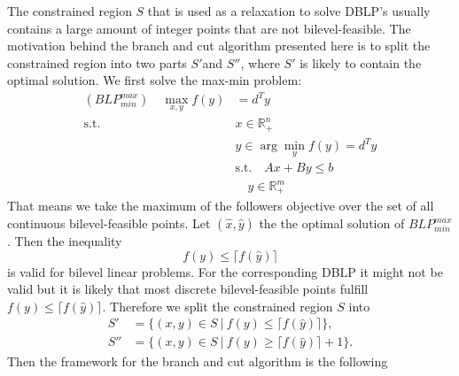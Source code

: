 \documentclass{article}
\begin{document}
The constrained region $S$ that is used as a relaxation to solve DBLP's usually contains a large amount of integer points that are not bilevel-feasible. The motivation behind the branch and cut algorithm presented here is to split the constrained region into two parts $S'$and $S''$, where $S'$ is likely to contain the optimal solution.
We first solve the max-min problem:
	\begin{align*}
	(BLP^{max}_{min}) \quad \max_{x,y} f(y) &= d^T y \\
	\text{s.t.} \quad &x \in \mathbb{R}^n_{+} \\
	&y \in \arg \min_{y} f(y) = d^Ty \\
	&\text{s.t.} \quad Ax + By \le b \\
	& \quad y \in \mathbb{R}^m_{+}
	\end{align*}
That means we take the maximum of the followers objective over the set of all continuous bilevel-feasible points. Let $(\hat x, \hat y)$ the the optimal solution of $BLP^{max}_{min}$. Then the inequality
\begin{equation*}
	f(y) \le \lceil f(\hat y) \rceil
\end{equation*}
is valid for bilevel linear problems. For the corresponding DBLP it might not be valid but it is likely that most discrete bilevel-feasible points fulfill $f(y) \le \lceil f(\hat y) \rceil$.
Therefore we split the constrained region $S$ into 
\begin{align*}
	S' &= \{(x,y) \in S \ | \ f(y) \le \lceil f(\hat y) \rceil \}, \\
	S'' &= \{(x,y) \in S \ | \ f(y) \ge \lceil f(\hat y) \rceil + 1\}.
\end{align*}
Then the framework for the branch and cut algorithm is the following
\end{document}
